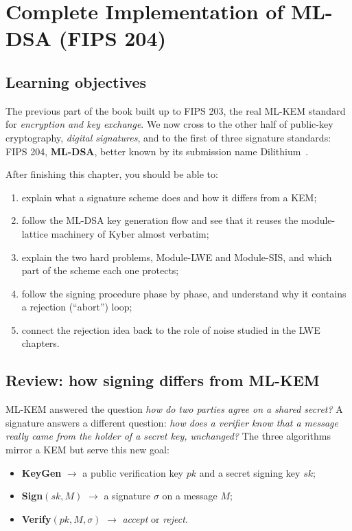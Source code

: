\chapter{Complete Implementation of ML-DSA (FIPS 204)}
\label{ch:mldsa}

\section{Learning objectives}

The previous part of the book built up to FIPS 203, the real ML-KEM standard for \emph{encryption and key exchange}. We now cross to the other half of public-key cryptography, \emph{digital signatures}, and to the first of three signature standards: FIPS 204, \textbf{ML-DSA}, better known by its submission name Dilithium~\cite{fips204,dilithium2018}.

After finishing this chapter, you should be able to:

\begin{enumerate}
  \item explain what a signature scheme does and how it differs from a KEM;
  \item follow the ML-DSA key generation flow and see that it reuses the module-lattice machinery of Kyber almost verbatim;
  \item explain the two hard problems, Module-LWE and Module-SIS, and which part of the scheme each one protects;
  \item follow the signing procedure phase by phase, and understand why it contains a rejection (``abort'') loop;
  \item connect the rejection idea back to the role of noise studied in the LWE chapters.
\end{enumerate}

\section{Review: how signing differs from ML-KEM}

ML-KEM answered the question \emph{how do two parties agree on a shared secret?} A signature answers a different question: \emph{how does a verifier know that a message really came from the holder of a secret key, unchanged?} The three algorithms mirror a KEM but serve this new goal:

\begin{itemize}
  \item \textbf{KeyGen} $\to$ a public verification key $pk$ and a secret signing key $sk$;
  \item \textbf{Sign}$(sk, M)$ $\to$ a signature $\sigma$ on a message $M$;
  \item \textbf{Verify}$(pk, M, \sigma)$ $\to$ \emph{accept} or \emph{reject}.
\end{itemize}

